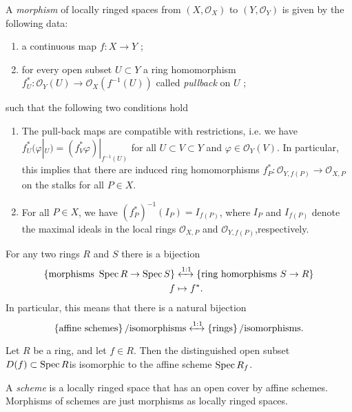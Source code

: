 \begin{definition}
  A \textit{morphism} of locally ringed spaces from $\left( X,\mathcal{O}_{X} \right) $ to $\left( Y,\mathcal{O}_{Y} \right) $ is given by the following data:
  \begin{enumerate}
    \item a continuous map $f:X\to Y$ ;
    \item for every open subset $U\subset Y$ a ring homomorphism $f^*_{U}:\mathcal{O}_{Y}(U)\to \mathcal{O}_{X}\left( f^{-1}(U) \right) $ called \textit{pullback} on $U$ ; 
  \end{enumerate}
  such that the following two conditions hold
  \begin{enumerate}
    \item The pull-back maps are compatible with restrictions, i.e. we have $f^*_U(\varphi |_{U})=\left( f^{*}_V \varphi \right) |_{f^{-1}(U)}$ for all $U\subset V\subset Y$ and $\varphi \in \mathcal{O}_{Y}(V)$. In particular, this implies that there are induced ring homomorphisms $f^{*}_P:\mathcal{O}_{Y,f(P)}\to \mathcal{O}_{X,P}$ on the stalks for all $P \in X$.
    \item For all $P\in  X$, we have $(f^{*}_{P})^{-1}(I_P)=I_{f(P)}$, where $I_P$ and $I_{f(P)}$ denote the maximal ideals in the local rings $\mathcal{O}_{X,P}$ and $\mathcal{O}_{Y,f(P)}$,respectively.
  \end{enumerate}
\end{definition}

\begin{proposition}
  For any two rings $R$ and $S$ there is a bijection
  \begin{align*}
    \left\{\text{morphisms }\operatorname{Spec} R \to \operatorname{Spec} S\right\} &\xleftrightarrow{1:1} \left\{\text{ring homorphisms } S\to R\right\}\\
    f &\mapsto  f^{*}
  .\end{align*}
  In particular, this means that there is a natural bijection
  \[
    \left\{\text{affine schemes}\right\} / \text{isomorphisms}\xleftrightarrow{1:1}\left\{\text{rings}\right\} /\text{isomorphisms}.
  \] 
\end{proposition}
\begin{proposition}
  Let $R$ be a ring, and let $f\in R$. Then the distinguished open subset $D(f)\subset \operatorname{Spec} R$is isomorphic to the affine scheme $\operatorname{Spec} R_f$.
\end{proposition}

\begin{definition}
  A \textit{scheme} is a locally ringed space that has an open cover by affine schemes. Morphisms of schemes are just morphisms as locally ringed spaces.
\end{definition}
